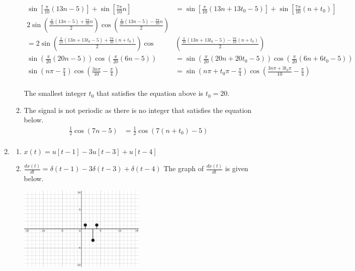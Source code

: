 \documentclass[10pt,a4paper, margin=1in]{article}
\begin{document}
\begin{enumerate}
\begin{enumerate}
\begin{align*}
        \sin[\frac{\pi}{10} (13n - 5)] + \sin[\frac{7\pi}{10}n] & = \sin[\frac{\pi}{10}(13n + 13t_0 - 5)] + \sin[\frac{7\pi}{10}(n + t_0)] \\
        2\sin(\frac{\frac{\pi}{10} (13n - 5) + \frac{7\pi}{10}n}{2})\cos(\frac{\frac{\pi}{10} (13n - 5) - \frac{7\pi}{10}n}{2}) & \\
        = 2\sin(\frac{\frac{\pi}{10} (13n + 13t_0 - 5) + \frac{7\pi}{10}(n + t_0)}{2})\cos&(\frac{\frac{\pi}{10} (13n + 13t_0 - 5) - \frac{7\pi}{10}(n + t_0)}{2}) \\
        \sin(\frac{\pi}{20}(20n - 5))\cos(\frac{\pi}{20}(6n - 5)) & = \sin(\frac{\pi}{20}(20n + 20t_0 - 5))\cos(\frac{\pi}{20}(6n + 6t_0 - 5)) \\
        \sin(n\pi - \frac{\pi}{4})\cos(\frac{3n\pi}{10} - \frac{\pi}{4}) & = \sin(n\pi + t_0\pi - \frac{\pi}{4})\cos(\frac{3n\pi + 3t_0\pi}{10} - \frac{\pi}{4}) \\
    \end{align*}

    The smallest integer $t_0$ that satisfies the equation above is $t_0 = 20$.
	\item The signal is not periodic as there is no integer that satisfies the equation below.
    \begin{align*}
        \frac{1}{2}\cos(7n - 5) & = \frac{1}{2}\cos(7(n + t_0) - 5) \\
    \end{align*}
    \end{enumerate}

\item %
    \begin{enumerate}
    \item $x(t) = u[t-1] - 3u[t-3] + u[t-4]$
    \item $\frac{dx(t)}{dt} = \delta(t-1) -3\delta(t-3) +\delta(t-4)$
        The graph of $\frac{dx(t)}{dt}$ is given below.
        \begin{center}
            \includegraphics*[width=0.5\textwidth]{assets/graphs/q5b.png}
        \end{center}
    \end{enumerate}    
    

\end{enumerate}
\end{document}
